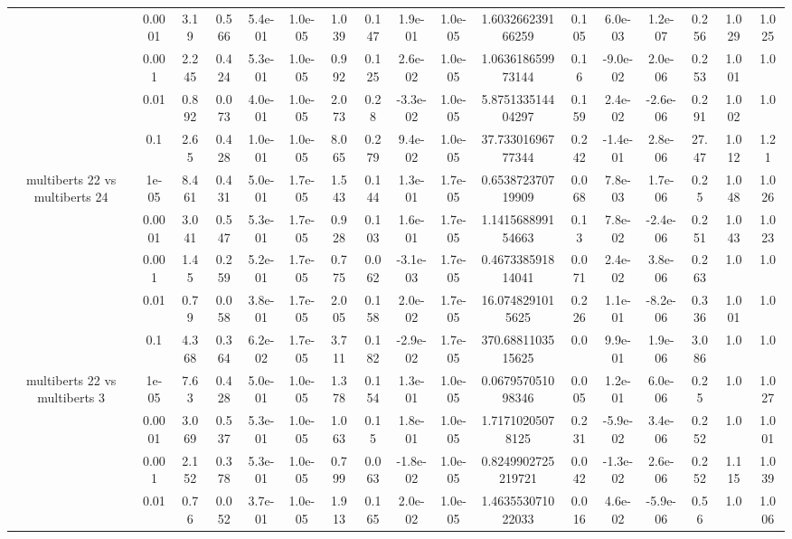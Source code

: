 \begin{tabular}{|c|c|c|c|c|c|c|c|c|c|c|c|c|c|c|c|c|}
 & 0.0001 & 3.19 & 0.566 & 5.4e-01 & 1.0e-05 & 1.039 & 0.147 & 1.9e-01 & 1.0e-05 & 1.603266239166259 & 0.105 & 6.0e-03 & 1.2e-07 & 0.256 & 1.029 & 1.025 \\
 & 0.001 & 2.245 & 0.424 & 5.3e-01 & 1.0e-05 & 0.992 & 0.125 & 2.6e-02 & 1.0e-05 & 1.063618659973144 & 0.16 & -9.0e-02 & 2.0e-06 & 0.253 & 1.001 & 1.0 \\
 & 0.01 & 0.892 & 0.073 & 4.0e-01 & 1.0e-05 & 2.073 & 0.28 & -3.3e-02 & 1.0e-05 & 5.875133514404297 & 0.159 & 2.4e-02 & -2.6e-06 & 0.291 & 1.002 & 1.0 \\
 & 0.1 & 2.65 & 0.428 & 1.0e-01 & 1.0e-05 & 8.065 & 0.279 & 9.4e-02 & 1.0e-05 & 37.73301696777344 & 0.242 & -1.4e-01 & 2.8e-06 & 27.47 & 1.012 & 1.21 \\
\hline
\multirow{5}{*}{multiberts 22 vs multiberts 24} & 1e-05 & 8.461 & 0.431 & 5.0e-01 & 1.7e-05 & 1.543 & 0.144 & 1.3e-01 & 1.7e-05 & 0.653872370719909 & 0.068 & 7.8e-03 & 1.7e-06 & 0.25 & 1.048 & 1.026 \\
 & 0.0001 & 3.041 & 0.547 & 5.3e-01 & 1.7e-05 & 0.928 & 0.103 & 1.6e-01 & 1.7e-05 & 1.141568899154663 & 0.13 & 7.8e-02 & -2.4e-06 & 0.251 & 1.043 & 1.023 \\
 & 0.001 & 1.45 & 0.259 & 5.2e-01 & 1.7e-05 & 0.775 & 0.062 & -3.1e-03 & 1.7e-05 & 0.467338591814041 & 0.071 & 2.4e-02 & 3.8e-06 & 0.263 & 1.0 & 1.0 \\
 & 0.01 & 0.79 & 0.058 & 3.8e-01 & 1.7e-05 & 2.005 & 0.158 & 2.0e-02 & 1.7e-05 & 16.0748291015625 & 0.226 & 1.1e-01 & -8.2e-06 & 0.336 & 1.001 & 1.0 \\
 & 0.1 & 4.368 & 0.364 & 6.2e-02 & 1.7e-05 & 3.711 & 0.182 & -2.9e-02 & 1.7e-05 & 370.6881103515625 & 0.0 & 9.9e-01 & 1.9e-06 & 3.086 & 1.0 & 1.0 \\
\hline
\multirow{5}{*}{multiberts 22 vs multiberts 3} & 1e-05 & 7.63 & 0.428 & 5.0e-01 & 1.0e-05 & 1.378 & 0.154 & 1.3e-01 & 1.0e-05 & 0.067957051098346 & 0.005 & 1.2e-01 & 6.0e-06 & 0.25 & 1.0 & 1.027 \\
 & 0.0001 & 3.069 & 0.537 & 5.3e-01 & 1.0e-05 & 1.063 & 0.15 & 1.8e-01 & 1.0e-05 & 1.71710205078125 & 0.231 & -5.9e-02 & 3.4e-06 & 0.252 & 1.0 & 1.001 \\
 & 0.001 & 2.152 & 0.378 & 5.3e-01 & 1.0e-05 & 0.799 & 0.063 & -1.8e-02 & 1.0e-05 & 0.8249902725219721 & 0.042 & -1.3e-02 & 2.6e-06 & 0.252 & 1.115 & 1.039 \\
 & 0.01 & 0.76 & 0.052 & 3.7e-01 & 1.0e-05 & 1.913 & 0.165 & 2.0e-02 & 1.0e-05 & 1.463553071022033 & 0.016 & 4.6e-02 & -5.9e-06 & 0.56 & 1.0 & 1.006 \\

\end{tabular}
